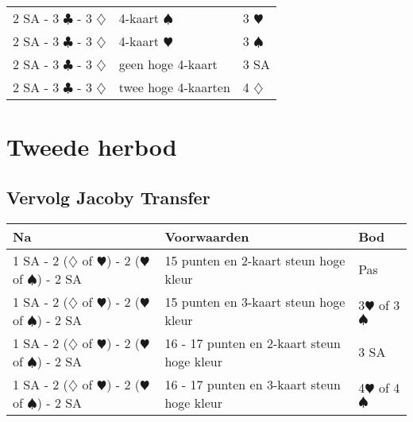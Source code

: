 \documentclass[12pt,a4paper]{report}
\begin{document}
\begin{tabular}{|l|p{4cm}|l|}
	& 
	& \\
	\hline
	
	2 SA - 3 $\clubsuit$ - 3 $\diamondsuit$ 
	& 4-kaart $\spadesuit$
	& 3 $\varheartsuit$\\
	\hline
	
	2 SA - 3 $\clubsuit$ - 3 $\diamondsuit$
	& 4-kaart $\varheartsuit$
	& 3 $\spadesuit$ \\
	\hline
	
	2 SA - 3 $\clubsuit$ - 3 $\diamondsuit$
	& geen hoge 4-kaart 
	& 3 SA \\
	\hline
	
	2 SA - 3 $\clubsuit$ - 3 $\diamondsuit$
	& twee hoge 4-kaarten
	& 4 $\diamondsuit$ \\
	\hline
\end{tabular}


\chapter{Tweede herbod}
\section{Vervolg Jacoby Transfer}
\begin{tabular}{|l|p{5cm}|l|}
	\hline 
	\textbf{Na} &\textbf{Voorwaarden}  &\textbf{Bod}  \\  
	\hline	
	1 SA - 2 ($\diamondsuit$ of $\varheartsuit$) - 2 ($\varheartsuit$ of $\spadesuit$) - 2 SA
	& 15 punten\newline
	  en 2-kaart steun hoge kleur
	& Pas \\
	\hline  
	
	1 SA - 2 ($\diamondsuit$ of $\varheartsuit$) - 2 ($\varheartsuit$ of $\spadesuit$) - 2 SA
	& 15 punten\newline
	  en 3-kaart steun hoge kleur 
	& 3$\varheartsuit$ of 3$\spadesuit$ \\
	\hline
		
	1 SA - 2 ($\diamondsuit$ of $\varheartsuit$) - 2 ($\varheartsuit$ of $\spadesuit$) - 2 SA
	& 16 - 17 punten\newline
	  en 2-kaart steun hoge kleur 
	& 3 SA \\
	\hline
	
	1 SA - 2 ($\diamondsuit$ of $\varheartsuit$) - 2 ($\varheartsuit$ of $\spadesuit$) - 2 SA
	& 16 - 17 punten\newline
	  en 3-kaart steun hoge kleur 
	& 4$\varheartsuit$ of 4$\spadesuit$ \\
	\hline
\end{tabular}
\end{document}
